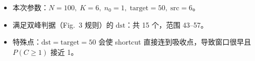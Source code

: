\begin{itemize}
  \item 本次参数：$N=100,\;K=6,\;n_0=1,\;\mathrm{target}=50,\;\mathrm{src}=6$。
  \item 满足双峰判据（Fig.~3 规则）的 $\mathrm{dst}$：共 15 个，范围 43--57。
  \item 特殊点：$\mathrm{dst}=\mathrm{target}=50$ 会使 shortcut 直接连到吸收点，导致窗口很早且 $P(C\geq 1)$ 接近 1。
\end{itemize}
